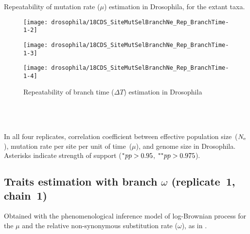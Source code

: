 \begin{table}[htbp]
    \renewcommand{\arraystretch}{0.5}
    \scriptsize \centering
    
    \caption[Repeatability of mutation rate estimation in Drosophila]{Repeatability of mutation rate ($\mu$) estimation in Drosophila, for the extant taxa.}
\end{table}

\begin{figure}[H]
    \centering
    \begin{minipage}{0.32\linewidth}
        \texttt{[image: drosophila/18CDS\_SiteMutSelBranchNe\_Rep\_BranchTime-1-2]}
    \end{minipage} \hfill
    \begin{minipage}{0.32\linewidth}
        \texttt{[image: drosophila/18CDS\_SiteMutSelBranchNe\_Rep\_BranchTime-1-3]}
    \end{minipage} \hfill
    \begin{minipage}{0.32\linewidth}
        \texttt{[image: drosophila/18CDS\_SiteMutSelBranchNe\_Rep\_BranchTime-1-4]}
    \end{minipage}
    \caption[Repeatability of branch time estimation in Drosophila]{Repeatability of branch time ($\Delta T$) estimation in Drosophila}
\end{figure}

\begin{table}[H]
     \\
     \\
     \\
    
    \caption[Correlation matrix repeatability in Drosophila]{
    In all four replicates, correlation coefficient between effective population size~($N_{\text{e}}$), mutation rate per site per unit of time~($\mu$), and genome size in Drosophila.
    Asterisks indicate strength of support ($\smash{^{*}} pp > 0.95$, $\smash{^{**}} pp > 0.975$).}
\end{table}

\subsection{Traits estimation with branch \texorpdfstring{$\omega$}{ω} (replicate~1, chain~1)}
Obtained with the phenomenological inference model of log-Brownian process for the $\mu$ and the relative non-synonymous substitution rate ($\omega$), as in \citet{Lartillot2011}.

